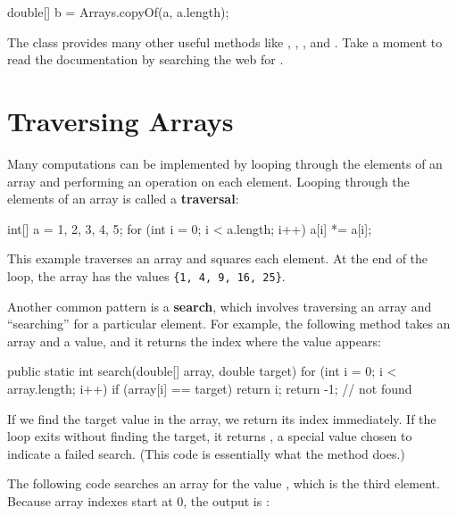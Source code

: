 \begin{code}
double[] b = Arrays.copyOf(a, a.length);
\end{code}

The  class provides many other useful methods like , , , and .
Take a moment to read the documentation by searching the web for .


\section{Traversing Arrays}
\label{traversal}


Many computations can be implemented by looping through the elements of an array and performing an operation on each element.
Looping through the elements of an array is called a {\bf traversal}:

\begin{code}
int[] a = {1, 2, 3, 4, 5};
for (int i = 0; i < a.length; i++) {
    a[i] *= a[i];
}
\end{code}

This example traverses an array and squares each element.
At the end of the loop, the array has the values \verb"{1, 4, 9, 16, 25}".


Another common pattern is a {\bf search}, which involves traversing an array and ``searching'' for a particular element.
For example, the following method takes an array and a value, and it returns the index where the value appears:


\begin{code}
public static int search(double[] array, double target) {
    for (int i = 0; i < array.length; i++) {
        if (array[i] == target) {
            return i;
        }
    }
    return -1;  // not found
}
\end{code}

If we find the target value in the array, we return its index immediately.
If the loop exits without finding the target, it returns , a special value chosen to indicate a failed search.
(This code is essentially what the  method does.)

The following code searches an array for the value , which is the third element.
Because array indexes start at 0, the output is :

